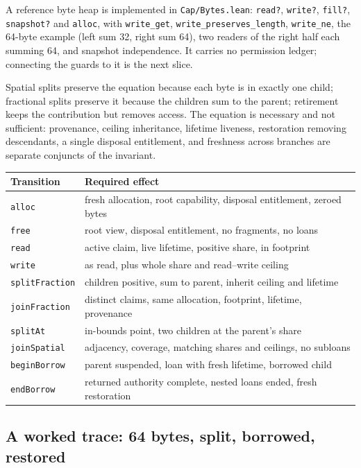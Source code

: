 \documentclass[10pt,a4paper]{article}
\newcommand{\file}[1]{\texttt{\small #1}}
\begin{document}
A reference byte heap is implemented in \file{Cap/Bytes.lean}: \texttt{read?}, \texttt{write?},
\texttt{fill?}, \texttt{snapshot?} and \texttt{alloc}, with \texttt{write\_get}, \texttt{write\_preserves\_length},
\texttt{write\_ne}, the 64-byte example (left sum 32, right sum 64), two readers of the
right half each summing 64, and snapshot independence. It carries no permission
ledger; connecting the guards to it is the next slice.

Spatial splits preserve the equation because each byte is in exactly one child;
fractional splits preserve it because the children sum to the parent; retirement
keeps the contribution but removes access. The equation is necessary and not
sufficient: provenance, ceiling inheritance, lifetime liveness, restoration
removing descendants, a single disposal entitlement, and freshness across
branches are separate conjuncts of the invariant.

\begin{center}
\begin{tabular}{@{}lp{}@{}}
\toprule
Transition & Required effect \\
\midrule
\texttt{alloc} & fresh allocation, root capability, disposal entitlement, zeroed bytes \\
\texttt{free} & root view, disposal entitlement, no fragments, no loans \\
\texttt{read} & active claim, live lifetime, positive share, in footprint \\
\texttt{write} & as read, plus whole share and read--write ceiling \\
\texttt{splitFraction} & children positive, sum to parent, inherit ceiling and lifetime \\
\texttt{joinFraction} & distinct claims, same allocation, footprint, lifetime, provenance \\
\texttt{splitAt} & in-bounds point, two children at the parent's share \\
\texttt{joinSpatial} & adjacency, coverage, matching shares and ceilings, no subloans \\
\texttt{beginBorrow} & parent suspended, loan with fresh lifetime, borrowed child \\
\texttt{endBorrow} & returned authority complete, nested loans ended, fresh restoration \\
\bottomrule
\end{tabular}
\end{center}

\subsection*{A worked trace: 64 bytes, split, borrowed, restored}
\end{document}
